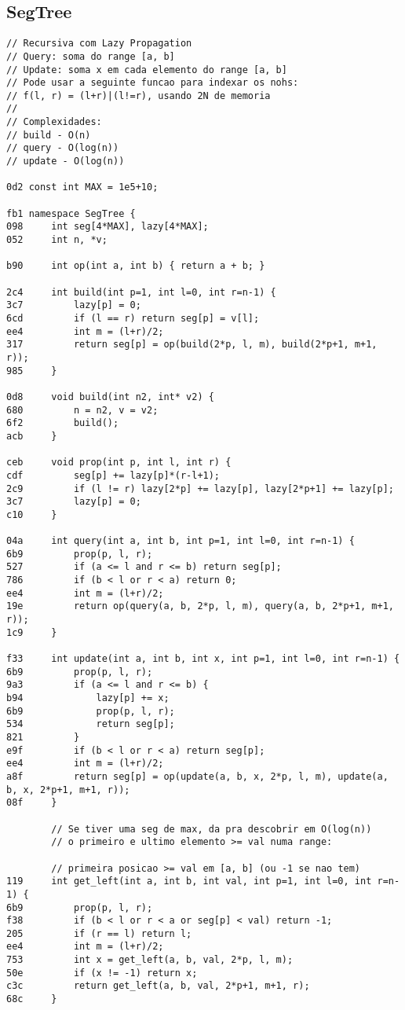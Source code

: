 \documentclass[11pt, a4paper, twoside]{article}
\begin{document}
\subsection{SegTree}
\begin{lstlisting}
// Recursiva com Lazy Propagation
// Query: soma do range [a, b]
// Update: soma x em cada elemento do range [a, b]
// Pode usar a seguinte funcao para indexar os nohs:
// f(l, r) = (l+r)|(l!=r), usando 2N de memoria
//
// Complexidades:
// build - O(n)
// query - O(log(n))
// update - O(log(n))

0d2 const int MAX = 1e5+10;

fb1 namespace SegTree {
098 	int seg[4*MAX], lazy[4*MAX];
052 	int n, *v;
    
b90 	int op(int a, int b) { return a + b; }
    
2c4 	int build(int p=1, int l=0, int r=n-1) {
3c7 		lazy[p] = 0;
6cd 		if (l == r) return seg[p] = v[l];
ee4 		int m = (l+r)/2;
317 		return seg[p] = op(build(2*p, l, m), build(2*p+1, m+1, r));
985 	}
    
0d8 	void build(int n2, int* v2) {
680 		n = n2, v = v2;
6f2 		build();
acb 	}
    
ceb 	void prop(int p, int l, int r) {
cdf 		seg[p] += lazy[p]*(r-l+1);
2c9 		if (l != r) lazy[2*p] += lazy[p], lazy[2*p+1] += lazy[p];
3c7 		lazy[p] = 0;
c10 	}
    
04a 	int query(int a, int b, int p=1, int l=0, int r=n-1) {
6b9 		prop(p, l, r);
527 		if (a <= l and r <= b) return seg[p];
786 		if (b < l or r < a) return 0;
ee4 		int m = (l+r)/2;
19e 		return op(query(a, b, 2*p, l, m), query(a, b, 2*p+1, m+1, r));
1c9 	}
    	
f33 	int update(int a, int b, int x, int p=1, int l=0, int r=n-1) {
6b9 		prop(p, l, r);
9a3 		if (a <= l and r <= b) {
b94 			lazy[p] += x;
6b9 			prop(p, l, r);
534 			return seg[p];
821 		}
e9f 		if (b < l or r < a) return seg[p];
ee4 		int m = (l+r)/2;
a8f 		return seg[p] = op(update(a, b, x, 2*p, l, m), update(a, b, x, 2*p+1, m+1, r));
08f 	}
    
    	// Se tiver uma seg de max, da pra descobrir em O(log(n))
    	// o primeiro e ultimo elemento >= val numa range:
    
    	// primeira posicao >= val em [a, b] (ou -1 se nao tem)
119 	int get_left(int a, int b, int val, int p=1, int l=0, int r=n-1) {
6b9 		prop(p, l, r);
f38 		if (b < l or r < a or seg[p] < val) return -1;
205 		if (r == l) return l;
ee4 		int m = (l+r)/2;
753 		int x = get_left(a, b, val, 2*p, l, m);
50e 		if (x != -1) return x;
c3c 		return get_left(a, b, val, 2*p+1, m+1, r);
68c 	}
    

\end{lstlisting}
\end{document}
